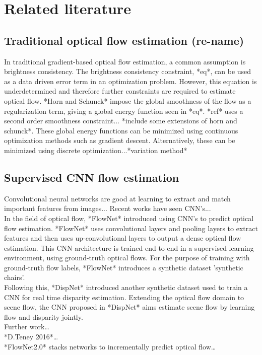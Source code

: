 
\section{Related literature}

\subsection{Traditional optical flow estimation (re-name)}
In traditional gradient-based optical flow estimation, a common assumption is brightness consistency. The brightness consistency constraint, *eq*, can be used as a data driven error term in an optimization problem. However, this equation is underdetermined and therefore further constraints are required to estimate optical flow. *Horn and Schunck* impose the global smoothness of the flow as a regularization term, giving a global energy function seen in *eq*. *ref* uses a second order smoothness constraint... *include some extensions of horn and schunck*. These global energy functions can be minimized using continuous optimization methods such as gradient descent. Alternatively, these can be minimized using discrete optimization...*variation method* \\

\subsection{Supervised CNN flow estimation}
Convolutional neural networks are good at learning to extract and match important features from images...
Recent works have seen CNN’s... \\
In the field of optical flow, *FlowNet* introduced using CNN’s to predict optical flow estimation. *FlowNet* uses convolutional layers and pooling layers to extract features and then uses up-convolutional layers to output a dense optical flow estimation. This CNN architecture is trained end-to-end in a supervised learning environment, using ground-truth optical flows. For the purpose of training with ground-truth flow labels, *FlowNet* introduces a synthetic dataset 'synthetic chairs'.\\
Following this, *DispNet* introduced another synthetic dataset used to train a CNN for real time disparity estimation. Extending the optical flow domain to scene flow, the CNN proposed in *DispNet* aims estimate scene flow by learning flow and disparity jointly.\\
Further work… \\
*D.Teney 2016*… \\
*FlowNet2.0* stacks networks to incrementally predict optical flow…\\

